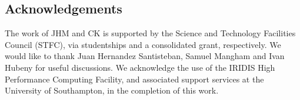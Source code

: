 \documentclass[preprint, a4paper, 11pt]{aastex}
\begin{document}











\subsection*{Acknowledgements}
The work of JHM and CK is supported by the Science and Technology Facilities Council (STFC), 
via studentships and a consolidated grant, respectively. We would like to thank Juan Hernandez Santisteban, Samuel Mangham and Ivan Hubeny for useful discussions. 
We acknowledge the use of the IRIDIS High Performance Computing Facility, 
and associated support services at the University of Southampton, in the completion of this work.



\end{document}
